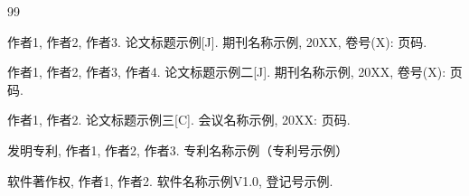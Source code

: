\begin{publications}{99}
  \item 作者1, 作者2, 作者3. 论文标题示例[J]. 期刊名称示例, 20XX, 卷号(X): 页码.
  \item 作者1, 作者2, 作者3, 作者4. 论文标题示例二[J]. 期刊名称示例, 20XX, 卷号(X): 页码.
  \item 作者1, 作者2. 论文标题示例三[C]. 会议名称示例, 20XX: 页码.

  \item 发明专利, 作者1, 作者2, 作者3. 专利名称示例（专利号示例）
  \item 软件著作权, 作者1, 作者2. 软件名称示例V1.0, 登记号示例.
\end{publications}